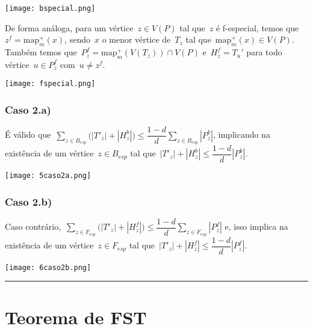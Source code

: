 \documentclass[a0,portrait]{a0poster}
\newcommand{\map}{\mathrm{map}}
\begin{document}
\begin{multicols}{3}
    \begin{center}
\texttt{[image: bspecial.png]}
\end{center}

    \bigskip
    \bigskip

    De forma análoga, para um vértice~${z\in V(P)}$ tal 
    que~$z$ é f-especial,
    temos que~${z^f = \map^+_m(x)}$,
    sendo~$x$ o menor vértice de~$T_z$ tal 
    que~${\map^+_m(x)\in V(P)}$.
    Também temos
    que~${P_z^f = \map^+_m(V(T_z))\cap V(P)}$
    e~${H_z^f =T_u'}$ para todo 
    vértice~${u\in P_z^f}$ com~${u\ne z^f}$.

\begin{center}
    \texttt{[image: fspecial.png]}
\end{center}
    \subsubsection*{Caso 2.a)}
        É válido que~${\displaystyle\sum_{z\in B_{esp}}
        \Big(|T'_{z}|+|H_z^b|\Big)\le
        \dfrac{1-d}{d}\displaystyle\sum_{z\in B_{esp}}|P_z^b|}$,
        implicando na existência de um vértice~${z\in B_{esp}}$ 
        tal que~${|T'_{z}|+|H_z^b|\le
        \dfrac{1-d}{d}|P_z^b|}$.

\begin{center}
    \texttt{[image: 5caso2a.png]}
\end{center}
    \subsubsection*{Caso 2.b)}
        Caso contrário,~${\displaystyle\sum_{z\in F_{esp}}
        \Big(|T'_{z}|+|H_z^f|\Big)\le
        \dfrac{1-d}{d}\displaystyle\sum_{z\in F_{esp}}|P_z^f|}$
        e, isso implica na existência de um vértice~${z\in F_{esp}}$ 
        tal 
        que~${|T'_{z}|+|H_z^f|\le
        \dfrac{1-d}{d}|P_z^f|}$.

\begin{center}
\texttt{[image: 6caso2b.png]}
\end{center}
\noindent\rule[0.5ex]{\linewidth}{1pt}

\section*{Teorema de FST}


\end{multicols}
\end{document}

